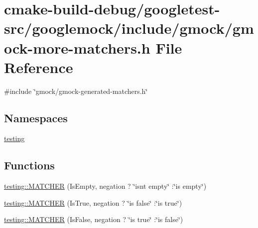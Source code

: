 \hypertarget{gmock-more-matchers_8h}{}\section{cmake-\/build-\/debug/googletest-\/src/googlemock/include/gmock/gmock-\/more-\/matchers.h File Reference}
\label{gmock-more-matchers_8h}
{\ttfamily \#include \char`\"{}gmock/gmock-\/generated-\/matchers.\+h\char`\"{}}\newline
\subsection*{Namespaces}
\begin{DoxyCompactItemize}
\item 
 \mbox{\hyperlink{namespacetesting}{testing}}
\end{DoxyCompactItemize}
\subsection*{Functions}
\begin{DoxyCompactItemize}
\item 
\mbox{\hyperlink{namespacetesting_a4fcb3f407119590471bea5a90a8d2dda}{testing\+::\+M\+A\+T\+C\+H\+ER}} (Is\+Empty, negation ? \char`\"{}isn\textquotesingle{}t empty\char`\"{} \+:\char`\"{}is empty\char`\"{})
\item 
\mbox{\hyperlink{namespacetesting_ab2b645db6909220993662cf43ed0d9e8}{testing\+::\+M\+A\+T\+C\+H\+ER}} (Is\+True, negation ? \char`\"{}is false\char`\"{} \+:\char`\"{}is true\char`\"{})
\item 
\mbox{\hyperlink{namespacetesting_a03fb223cceaefc67991ac36286dcbb34}{testing\+::\+M\+A\+T\+C\+H\+ER}} (Is\+False, negation ? \char`\"{}is true\char`\"{} \+:\char`\"{}is false\char`\"{})
\end{DoxyCompactItemize}
